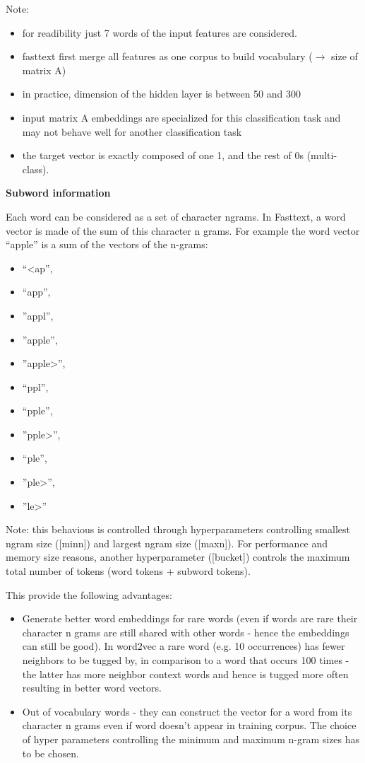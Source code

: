 Note: 
\begin{itemize}
	\item for readibility just 7 words of the input features are considered.
	\item fasttext first merge all features as one corpus to build vocabulary ($\rightarrow$ size of matrix A)
	\item in practice, dimension of the hidden layer is between 50 and 300
	\item input matrix A embeddings are specialized for this classification task and may not behave well for another classification task
	\item the target vector is exactly composed of one 1, and the rest of 0s (multi-class).
\end{itemize}

\textbf{Subword information}

Each word can be considered as a set of character ngrams. In Fasttext, a word vector is made of the sum of this character n grams. For example the word vector “apple” is a sum of the vectors of the n-grams:
\begin{multicols}{4}
\begin{itemize}
	\item “<ap”, 
	\item “app”, 
	\item ”appl”, 
	\item ”apple”, 
	\item ”apple>”, 
	\item “ppl”, 
	\item “pple”, 
	\item ”pple>”, 
	\item “ple”, 
	\item ”ple>”, 
	\item ”le>”
\end{itemize}
\end{multicols}
Note: this behavious is controlled through hyperparameters controlling smallest ngram size ([minn]) and largest ngram size ([maxn]). For performance and memory size reasons, another hyperparameter ([bucket]) controls the maximum total number of tokens (word tokens + subword tokens).

This provide the following advantages:
\begin{itemize}
	\item Generate better word embeddings for rare words (even if words are rare their character n grams are still shared with other words - hence the embeddings can still be good). In word2vec a rare word (e.g. 10 occurrences) has fewer neighbors to be tugged by, in comparison to a word that occurs 100 times - the latter has more neighbor context words and hence is tugged more often resulting in better word vectors.
	\item Out of vocabulary words - they can construct the vector for a word from its character n grams even if word doesn't appear in training corpus. The choice of hyper parameters controlling the minimum and maximum n-gram sizes has to be chosen.
\end{itemize}


